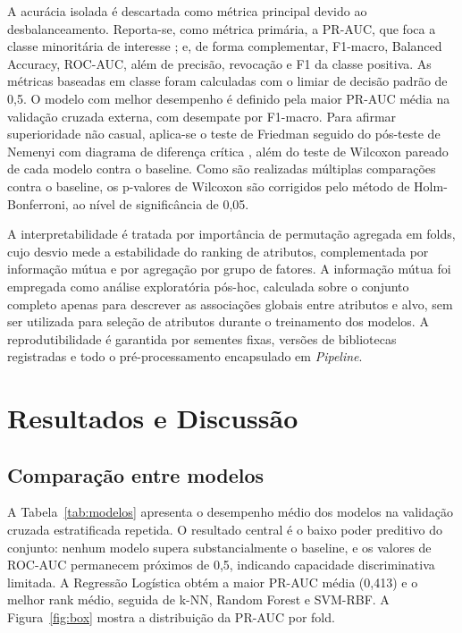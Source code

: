 \documentclass[12pt]{article}
\begin{document}
A acurácia isolada é descartada como métrica principal devido ao desbalanceamento. Reporta-se, como
métrica primária, a PR-AUC, que foca a classe minoritária de interesse \cite{saito2015}; e, de
forma complementar, F1-macro, Balanced Accuracy, ROC-AUC, além de precisão, revocação e F1 da
classe positiva. As métricas baseadas em classe foram calculadas com o limiar de decisão padrão de
0,5. O modelo com melhor desempenho é definido pela maior PR-AUC média na validação cruzada
externa, com desempate por F1-macro. Para afirmar superioridade não casual, aplica-se o teste de
Friedman seguido do pós-teste de Nemenyi com diagrama de diferença crítica \cite{demsar2006}, além
do teste de Wilcoxon pareado de cada modelo contra o baseline. Como são realizadas múltiplas
comparações contra o baseline, os p-valores de Wilcoxon são corrigidos pelo método de
Holm-Bonferroni, ao nível de significância de 0,05.

A interpretabilidade é tratada por importância de permutação agregada em folds, cujo desvio mede a
estabilidade do ranking de atributos, complementada por informação mútua e por agregação por grupo
de fatores. A informação mútua foi empregada como análise exploratória pós-hoc, calculada sobre o
conjunto completo apenas para descrever as associações globais entre atributos e alvo, sem ser
utilizada para seleção de atributos durante o treinamento dos modelos. A reprodutibilidade é
garantida por sementes fixas, versões de bibliotecas registradas e todo o pré-processamento
encapsulado em \textit{Pipeline}.

\section{Resultados e Discussão}
\label{sec:resultados}

\subsection{Comparação entre modelos}

A Tabela~\ref{tab:modelos} apresenta o desempenho médio dos modelos na validação cruzada
estratificada repetida. O resultado central é o baixo poder preditivo do conjunto: nenhum modelo
supera substancialmente o baseline, e os valores de ROC-AUC permanecem próximos de 0,5, indicando
capacidade discriminativa limitada. A Regressão Logística obtém a maior PR-AUC média (0,413) e o
melhor rank médio, seguida de k-NN, Random Forest e SVM-RBF. A Figura~\ref{fig:box} mostra a
distribuição da PR-AUC por fold.
\end{document}
